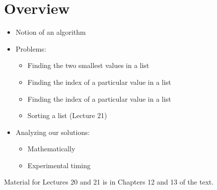 \documentclass[letterpaper,10pt,english]{sphinxmanual}
\begin{document}
\section{Overview}
\label{\detokenize{lecture_notes/lec20_searching:overview}}\begin{itemize}
\item {} 
Notion of an algorithm

\item {} 
Problems:
\begin{itemize}
\item {} 
Finding the two smallest values in a list

\item {} 
Finding the index of a particular value in a list

\item {} 
Finding the index of a particular value in a  list

\item {} 
Sorting a list (Lecture 21)

\end{itemize}

\item {} 
Analyzing our solutions:
\begin{itemize}
\item {} 
Mathematically

\item {} 
Experimental timing

\end{itemize}

\end{itemize}

Material for Lectures 20 and 21 is in Chapters 12 and 13 of the text.
\end{document}
